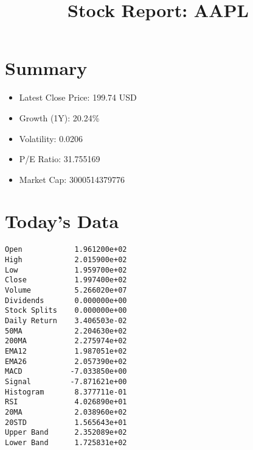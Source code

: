 \documentclass{article}
\title{Stock Report: AAPL}
\date{}
\begin{document}
\maketitle

\section*{Summary}
\begin{itemize}
    \item Latest Close Price: 199.74 USD
    \item Growth (1Y): 20.24\%
    \item Volatility: 0.0206
    \item P/E Ratio: 31.755169
    \item Market Cap: 3000514379776
\end{itemize}

\section*{Today's Data}
\begin{verbatim}
Open            1.961200e+02
High            2.015900e+02
Low             1.959700e+02
Close           1.997400e+02
Volume          5.266020e+07
Dividends       0.000000e+00
Stock Splits    0.000000e+00
Daily Return    3.406503e-02
50MA            2.204630e+02
200MA           2.275974e+02
EMA12           1.987051e+02
EMA26           2.057390e+02
MACD           -7.033850e+00
Signal         -7.871621e+00
Histogram       8.377711e-01
RSI             4.026890e+01
20MA            2.038960e+02
20STD           1.565643e+01
Upper Band      2.352089e+02
Lower Band      1.725831e+02
\end{verbatim}
\end{document}
